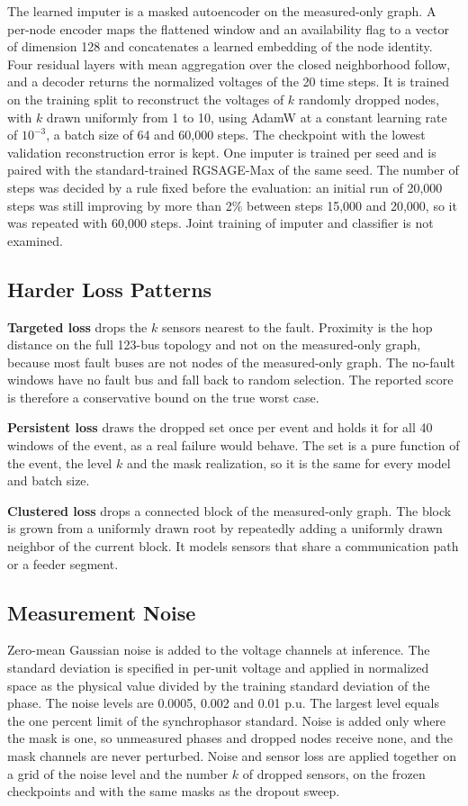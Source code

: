 \documentclass[MTech]{ugthesis}
\begin{document}
The learned imputer is a masked autoencoder on the measured-only graph. A per-node encoder maps the flattened window and an availability flag to a vector of dimension 128 and concatenates a learned embedding of the node identity. Four residual layers with mean aggregation over the closed neighborhood follow, and a decoder returns the normalized voltages of the 20 time steps. It is trained on the training split to reconstruct the voltages of $k$ randomly dropped nodes, with $k$ drawn uniformly from 1 to 10, using AdamW at a constant learning rate of $10^{-3}$, a batch size of 64 and 60,000 steps. The checkpoint with the lowest validation reconstruction error is kept. One imputer is trained per seed and is paired with the standard-trained RGSAGE-Max of the same seed. The number of steps was decided by a rule fixed before the evaluation: an initial run of 20,000 steps was still improving by more than 2\% between steps 15,000 and 20,000, so it was repeated with 60,000 steps. Joint training of imputer and classifier is not examined.

\subsection{Harder Loss Patterns}

\textbf{Targeted loss} drops the $k$ sensors nearest to the fault. Proximity is the hop distance on the full 123-bus topology and not on the measured-only graph, because most fault buses are not nodes of the measured-only graph. The no-fault windows have no fault bus and fall back to random selection. The reported score is therefore a conservative bound on the true worst case.

\textbf{Persistent loss} draws the dropped set once per event and holds it for all 40 windows of the event, as a real failure would behave. The set is a pure function of the event, the level $k$ and the mask realization, so it is the same for every model and batch size.

\textbf{Clustered loss} drops a connected block of the measured-only graph. The block is grown from a uniformly drawn root by repeatedly adding a uniformly drawn neighbor of the current block. It models sensors that share a communication path or a feeder segment.

\subsection{Measurement Noise}

Zero-mean Gaussian noise is added to the voltage channels at inference. The standard deviation is specified in per-unit voltage and applied in normalized space as the physical value divided by the training standard deviation of the phase. The noise levels are 0.0005, 0.002 and 0.01 p.u. The largest level equals the one percent limit of the synchrophasor standard. Noise is added only where the mask is one, so unmeasured phases and dropped nodes receive none, and the mask channels are never perturbed. Noise and sensor loss are applied together on a grid of the noise level and the number $k$ of dropped sensors, on the frozen checkpoints and with the same masks as the dropout sweep.
\end{document}
